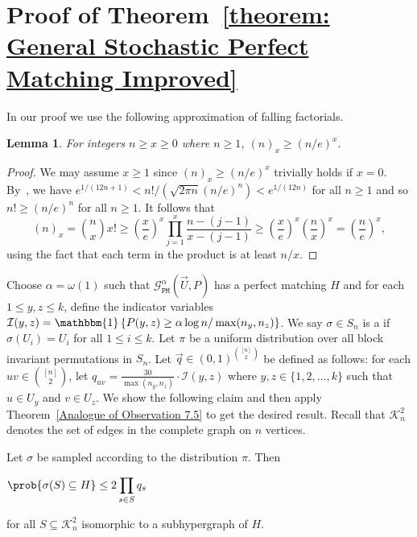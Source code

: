\documentclass[12pt]{article}
\newtheorem{lemma}[theorem]{Lemma}
\begin{document}
\section{Proof of Theorem~\ref{theorem: General Stochastic Perfect Matching Improved}}
\label{section: SBM proof}

In our proof we use the following approximation of falling factorials. 
\begin{lemma}
\label{lemma: Stirling Bound}
For integers $n\geq x\geq 0$ where $n\geq 1$, $(n)_x\geq (n/e)^x$.
\end{lemma}

\begin{proof}
We may assume $x\geq 1$ since $(n)_x\geq (n/e)^x$ trivially holds if $x = 0$. By~\cite{stirlingRemark}, we have $e^{1/(12n+1)} < n!/(\sqrt{2\pi n} (n/e)^n) < e^{1/(12n)}$ for all $n\geq 1$ and so $n!\geq (n/e)^n$ for all $n\geq 1$. It follows that
\[
    (n)_{x} = \binom{n}{x}x!\geq\left(\frac{x}{e}\right)^{x}\prod\limits_{j = 1}^{x}\frac{n-(j-1)}{x-(j-1)}\geq\left(\frac{x}{e}\right)^{x}\left(\frac{n}{x}\right)^{x} = \left(\frac{n}{e}\right)^{x},
\]
using the fact that each term in the product is at least $n/x$.
\end{proof}


Choose $\alpha = \omega(1)$ such that $\mathcal{G}_{\texttt{PM}}^\alpha(\vec{U}, P)$ has a perfect matching $H$ and for each $1\leq y,z\leq k$, define the indicator variables $\mathcal{I}(y,z) = \mathbbm{1}\left\{P(y,z)\geq\alpha\log n/\max(n_y, n_z)\right\}$.
We say $\sigma\in S_n$ is a  if $\sigma(U_i) = U_i$ for all $1\leq i\leq k$. Let $\pi$ be a uniform distribution over all block invariant permutations in $S_n$. Let $\vec{q}\in (0,1)^{\binom{[n]}{2}}$ be defined as follows: for each $uv\in \binom{[n]}{2}$, let $q_{uv} = \frac{30}{\max(n_y,n_z)}\cdot\mathcal{I}(y,z)$ where $y,z\in\{1,2,\ldots,k\}$ such that $u\in U_y$ and $v\in U_z$. We show the following claim and then apply Theorem~\ref{Analogue of Observation 7.5} to get the desired result.
Recall that $\mathcal{K}_n^2$ denotes the set of edges in the complete graph on $n$ vertices.

\begin{claim}
\label{claim: PM Spread Inequality}
Let $\sigma$ be sampled according to the distribution $\pi$. Then
\begin{center}
    $\prob{\sigma(S)\subseteq H}\leq 2\displaystyle\prod\limits_{s\in S} q_s$
\end{center}
for all $S\subseteq\mathcal{K}_n^2$ isomorphic to a subhypergraph of $H$.
\end{claim}
\end{document}

